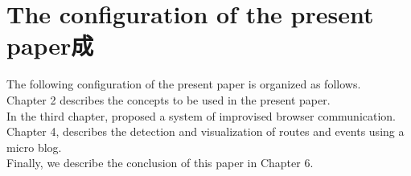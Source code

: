 \section{The configuration of the present paper成}
The following configuration of the present paper is organized as follows. \\
Chapter 2 describes the concepts to be used in the present paper. \\
In the third chapter, proposed a system of improvised browser communication. \\
Chapter 4, describes the detection and visualization of routes and events using a micro blog. \\
Finally, we describe the conclusion of this paper in Chapter 6. \\
